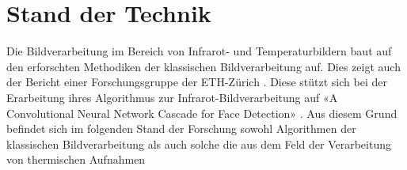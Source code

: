 \chapter{Stand der Technik}
\label{ch:StandDerTechnik}

Die Bildverarbeitung im Bereich von Infrarot- und Temperaturbildern baut auf den erforschten Methodiken der klassischen Bildverarbeitung auf. Dies zeigt auch der Bericht einer Forschungsgruppe der ETH-Zürich\parencite{gomez2018thermal} . Diese stützt sich bei der Erarbeitung ihres Algorithmus zur Infrarot-Bildverarbeitung auf «A Convolutional Neural Network Cascade for Face Detection»\parencite{li2015convolutional} . Aus diesem Grund befindet sich im folgenden Stand der Forschung sowohl Algorithmen der klassischen Bildverarbeitung als auch solche die aus dem Feld der Verarbeitung von thermischen Aufnahmen\\

